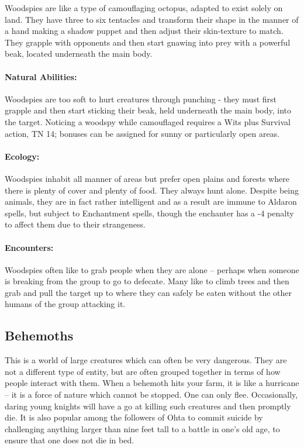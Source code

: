 \label{woodspy}
\woodspy

Woodspies are like a type of camouflaging octopus, adapted to exist solely on land.  They have three to six tentacles and transform their shape in the manner of a hand making a shadow puppet and then adjust their skin-texture to match.  They grapple with opponents and then start gnawing into prey with a powerful beak, located underneath the main body.

	\paragraph{Natural Abilities:} Woodspies are too soft to hurt creatures through punching - they must first grapple and then start sticking their beak, held underneath the main body, into the target.  Noticing a woodspy while camouflaged requires a Wits plus Survival action, TN 14; bonuses can be assigned for sunny or particularly open areas.

	\paragraph{Ecology:} Woodspies inhabit all manner of areas but prefer open plains and forests where there is plenty of cover and plenty of food.  They always hunt alone.  Despite being animals, they are in fact rather intelligent and as a result are immune to Aldaron spells, but subject to Enchantment spells, though the enchanter has a -4 penalty to affect them due to their strangeness.

	\paragraph{Encounters:} Woodspies often like to grab people when they are alone -- perhaps when someone is breaking from the group to go to defecate.  Many like to climb trees and then grab and pull the target up to where they can safely be eaten without the other humans of the group attacking it.

\subsection{Behemoths}

This is a world of large creatures which can often be very dangerous.  They are not a different type of entity, but are often grouped together in terms of how people interact with them.  When a behemoth hits your farm, it is like a hurricane -- it is a force of nature which cannot be stopped.  One can only flee.  Occasionally, daring young knights will have a go at killing such creatures and then promptly die.  It is also popular among the followers of Ohta to commit suicide by challenging anything larger than nine feet tall to a battle in one's old age, to ensure that one does not die in bed.


